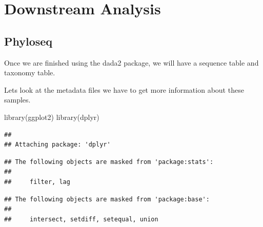 \documentclass[
]{book}
\newenvironment{Shaded}{\begin{snugshade}}{\end{snugshade}}
\newcommand{\AttributeTok}[1]{\textcolor[rgb]{0.77,0.63,0.00}{#1}}
\newcommand{\FunctionTok}[1]{\textcolor[rgb]{0.00,0.00,0.00}{#1}}
\newcommand{\NormalTok}[1]{#1}
\newcommand{\OtherTok}[1]{\textcolor[rgb]{0.56,0.35,0.01}{#1}}
\newcommand{\SpecialCharTok}[1]{\textcolor[rgb]{0.00,0.00,0.00}{#1}}
\newcommand{\StringTok}[1]{\textcolor[rgb]{0.31,0.60,0.02}{#1}}
\begin{document}
\hypertarget{downstream-analysis}{%
\chapter{Downstream Analysis}\label{downstream-analysis}}

\hypertarget{phyloseq}{%
\section{Phyloseq}\label{phyloseq}}

Once we are finished using the dada2 package, we will have a sequence table and taxonomy table.

Lets look at the metadata files we have to get more information about these samples.

\begin{Shaded}
\begin{Highlighting}[]
\FunctionTok{library}\NormalTok{(ggplot2)}
\FunctionTok{library}\NormalTok{(dplyr)}
\end{Highlighting}
\end{Shaded}

\begin{verbatim}
## 
## Attaching package: 'dplyr'
\end{verbatim}

\begin{verbatim}
## The following objects are masked from 'package:stats':
## 
##     filter, lag
\end{verbatim}

\begin{verbatim}
## The following objects are masked from 'package:base':
## 
##     intersect, setdiff, setequal, union
\end{verbatim}

\begin{Shaded}
\end{Shaded}
\end{document}
